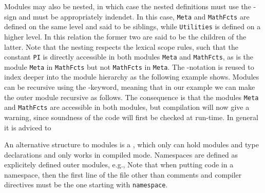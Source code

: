 Modules may also be nested, in which case the nested definitions must use the \lexeme{=}-sign and must be appropriately indendet.
%
%
In this case, \lstinline{Meta} and \lstinline{MathFcts} are defined on the same level and said to be siblings, while \lstinline{Utilities} is defined on a higher level. In this relation the former two are said to be the children of the latter.  Note that the nesting respects the lexical scope rules, such that the constant \lstinline{PI} is directly accessible in both modules \lstinline{Meta} and \lstinline{MathFcts}, as is the module \lstinline{Meta} in \lstinline{MathFcts} but not \lstinline{MathFcts} in \lstinline{Meta}.  The -notation is reused to index deeper into the module hierarchy as the following example shows.
%
%
Modules can be recursive using the -keyword, meaning that in our example we can make the outer module recursive as follows.
%
%
The consequence is that the modules \lstinline{Meta} and \lstinline{MathFcts} are accessible in both modules, but compilation will now give a warning, since soundness of the code will first be checked at run-time. In general it is adviced to 

An alternative structure to modules is a , which only can hold modules and type declarations and only works in compiled mode. Namespaces are defined as explicitely defined outer modules, e.g.,
%
%
Note that when putting code in a namespace, then the first line of the file other than comments and compiler directives must be the one starting with \lstinline{namespace}.

